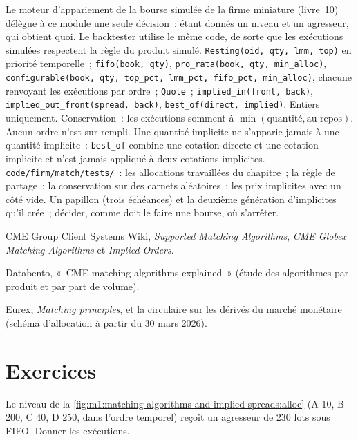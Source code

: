 \begin{build}
 Le moteur d'appariement de la bourse simulée de la firme miniature
(livre~10) délègue à ce module une seule décision~: étant donnés un niveau et
un agresseur, qui obtient quoi. Le backtester utilise le même code, de sorte que les
exécutions simulées respectent la règle du produit simulé.
 \texttt{Resting(oid, qty, lmm, top)} en priorité temporelle~;
\texttt{fifo(book, qty)}, \texttt{pro\_rata(book, qty, min\_alloc)},
\texttt{configurable(book, qty, top\_pct, lmm\_pct, fifo\_pct, min\_alloc)},
chacune renvoyant les exécutions par ordre~; \texttt{Quote}~; \texttt{implied\_in(front,
back)}, \texttt{implied\_out\_front(spread, back)}, \texttt{best\_of(direct,
implied)}.
 Entiers uniquement. Conservation~: les exécutions somment à $\min(\text{quantité},
\text{au repos})$. Aucun ordre n'est sur-rempli. Une quantité implicite ne s'apparie jamais
à une quantité implicite~: \texttt{best\_of} combine une cotation directe et une cotation implicite
et n'est jamais appliqué à deux cotations implicites.
 \texttt{code/firm/match/tests/}~: les allocations travaillées du
chapitre~; la règle de partage~; la conservation sur des carnets aléatoires~; les prix implicites
avec un côté vide.
 Un papillon (trois échéances) et la deuxième génération
d'implicites qu'il crée~; décider, comme doit le faire une bourse, où s'arrêter.
\end{build}

\begin{omsources}
\item CME Group Client Systems Wiki, \emph{Supported Matching Algorithms},
\emph{CME Globex Matching Algorithms} et \emph{Implied Orders}.
\item Databento, «~CME matching algorithms explained~» (étude des
algorithmes par produit et par part de volume).
\item Eurex, \emph{Matching principles}, et la circulaire sur les dérivés du
marché monétaire (schéma d'allocation à partir du 30 mars 2026).
\end{omsources}

\section{Exercices}

\begin{exercise}[$\star$]\label{exo:m1:matching-algorithms-and-implied-spreads:1}
Le niveau de la \cref{fig:m1:matching-algorithms-and-implied-spreads:alloc} (A 10,
B 200, C 40, D 250, dans l'ordre temporel) reçoit un agresseur de 230 lots sous
FIFO. Donner les exécutions.
\end{exercise}

